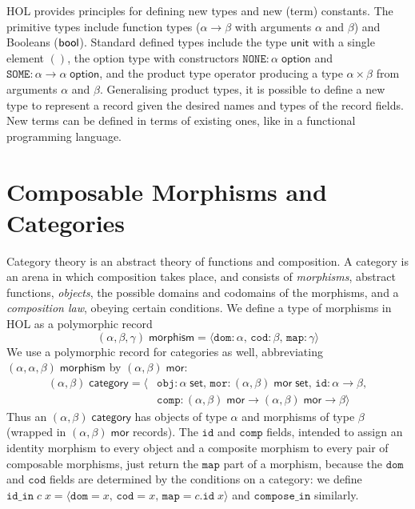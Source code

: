 \documentclass[twoside,titlepage,11pt]{article}
\begin{document}
HOL provides principles for defining new types and new (term) constants.
The primitive types include function types ($\alpha\to\beta$ with arguments $\alpha$ and $\beta$) and Booleans ($\mathsf{bool}$).
Standard defined types include the type $\mathsf{unit}$ with a single element $()$, the option type with constructors $\mathtt{NONE}:\alpha\;\mathsf{option}$ and $\mathtt{SOME}:\alpha\to\alpha\;\mathsf{option}$, and the product type operator producing a type $\alpha\times\beta$ from arguments $\alpha$ and $\beta$.
Generalising product types, it is possible to define a new type to represent a record given the desired names and types of the record fields.
New terms can be defined in terms of existing ones, like in a functional programming language.
\section{Composable Morphisms and Categories}%
Category theory is an abstract theory of functions and composition.
A category is an arena in which composition takes place, and consists of \emph{morphisms}, abstract functions, \emph{objects}, the possible domains and codomains of the morphisms, and a \emph{composition law}, obeying certain conditions.
We define a type of morphisms in HOL as a polymorphic record $$(\alpha,\beta,\gamma)\;\mathsf{morphism}=\langle\mathtt{dom}:\alpha,\,\mathtt{cod}:\beta,\,\mathtt{map}:\gamma\rangle$$
We use a polymorphic record for categories as well, abbreviating $(\alpha,\alpha,\beta)\;\mathsf{morphism}$ by $(\alpha,\beta)\;\mathsf{mor}$:
\begin{align*}
(\alpha,\beta)\;\mathsf{category}=\langle&\mathtt{obj}:\alpha\;\mathsf{set},\,\mathtt{mor}:(\alpha,\beta)\;\mathsf{mor}\;\mathsf{set},\,\mathtt{id}:\alpha\to\beta,\\&\mathtt{comp}:(\alpha,\beta)\;\mathsf{mor}\to(\alpha,\beta)\;\mathsf{mor}\to\beta\rangle
\end{align*}
Thus an $(\alpha,\beta)\;\mathsf{category}$ has objects of type $\alpha$ and morphisms of type $\beta$ (wrapped in $(\alpha,\beta)\;\mathsf{mor}$ records).
The $\mathtt{id}$ and $\mathtt{comp}$ fields, intended to assign an identity morphism to every object and a composite morphism to every pair of composable morphisms, just return the $\mathtt{map}$ part of a morphism, because the $\mathtt{dom}$ and $\mathtt{cod}$ fields are determined by the conditions on a category: we define $\mathtt{id\_in}\;c\;x=\langle\mathtt{dom}=x,\,\mathtt{cod}=x,\,\mathtt{map}=c.\mathtt{id}\;x\rangle$ and $\mathtt{compose\_in}$ similarly.
\end{document}
